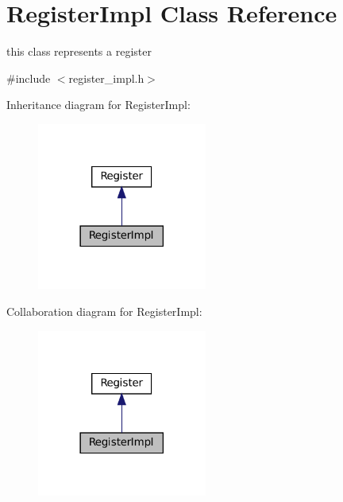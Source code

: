 \hypertarget{classRegisterImpl}{}\section{Register\+Impl Class Reference}
\label{classRegisterImpl}


this class represents a register  




{\ttfamily \#include $<$register\+\_\+impl.\+h$>$}



Inheritance diagram for Register\+Impl\+:\nopagebreak
\begin{figure}[H]
\begin{center}
\leavevmode
\includegraphics[width=158pt]{classRegisterImpl__inherit__graph}
\end{center}
\end{figure}


Collaboration diagram for Register\+Impl\+:\nopagebreak
\begin{figure}[H]
\begin{center}
\leavevmode
\includegraphics[width=158pt]{classRegisterImpl__coll__graph}
\end{center}
\end{figure}
